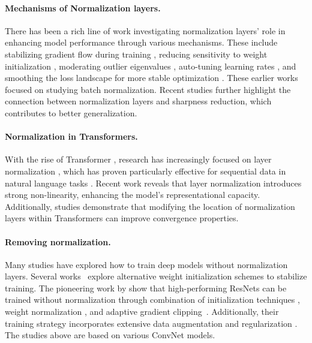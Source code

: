 \paragraph{Mechanisms of Normalization layers.}
There has been a rich line of work investigating normalization layers' role in enhancing model performance through various mechanisms.
These include stabilizing gradient flow during training \citep{balduzzi2017shattered, daneshmand2020batch, lubana2021beyond}, reducing sensitivity to weight initialization \citep{zhang2019fixup, de2020batch, shao2020normalization}, moderating outlier eigenvalues \citep{bjorck2018understanding,karakida2019normalization}, auto-tuning learning rates \citep{arora2018theoretical,tanaka2021noether}, and smoothing the loss landscape for more stable optimization \citep{santurkar2018does}.
These earlier works focused on studying batch normalization. Recent studies \citep{lyu2022understanding, dai2024crucial, mueller2024normalization} further highlight the connection between normalization layers and sharpness reduction, which contributes to better generalization.

\paragraph{Normalization in Transformers.} With the rise of Transformer \citep{vaswani2017attention}, research has increasingly focused on layer normalization \citep{ba2016layer}, which has proven particularly effective for sequential data in natural language tasks \citep{nguyen2019transformers, xu2019understanding, xiong2020layer}. 
Recent work \citep{ni2024nonlinearity} reveals that layer normalization introduces strong non-linearity, enhancing the model's representational capacity. Additionally, studies \citep{loshchilov2024ngpt, li2024mix} demonstrate that modifying the location of normalization layers within Transformers can improve convergence properties.


\paragraph{Removing normalization.}
Many studies have explored how to train deep models without normalization layers.
Several works~\citep{zhang2019fixup, de2020batch, bachlechner2021rezero} explore alternative weight initialization schemes to stabilize training.
The pioneering work by \citet{brock2021characterizing, brock2021high} show that high-performing ResNets can be trained without normalization \citep{smith2023convnets} through combination of initialization techniques \citep{de2020batch},  weight normalization \citep{salimans2016weight, huang2017centered, qiao2019micro}, and adaptive gradient clipping~\citep{brock2021high}. Additionally, their training strategy incorporates extensive data augmentation \citep{cubuk2020randaugment} and regularization \citep{srivastava2014dropout, huang2016deep}. The studies above are based on various ConvNet models.

